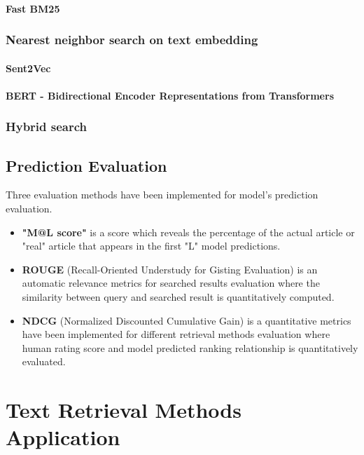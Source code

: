 \documentclass[10pt,a4paper,fleqn]{report}
\begin{document}
			\subsubsection{Fast BM25}
			
		\subsection{Nearest neighbor search on text embedding}
		
			\subsubsection{Sent2Vec}
			
			\subsubsection{BERT - Bidirectional Encoder Representations from Transformers}
			
		\subsection{Hybrid search}
		
	\section{Prediction Evaluation}
	
		Three evaluation methods have been implemented for model's prediction evaluation.
		
		\begin{itemize}
			\item \textbf{"M@L score"} is a score which reveals the percentage of the actual article or "real" article that appears in the first "L" model predictions.
			\item \textbf{ROUGE} (Recall-Oriented Understudy for Gisting Evaluation) is an automatic relevance metrics for searched results evaluation where the similarity between query and searched result is quantitatively computed.
			\item \textbf{NDCG} (Normalized Discounted Cumulative Gain) is a quantitative metrics have been implemented for different retrieval methods evaluation where human rating score and model predicted ranking relationship is quantitatively evaluated.
		\end{itemize}
	
\chapter{Text Retrieval Methods Application}
\end{document}
